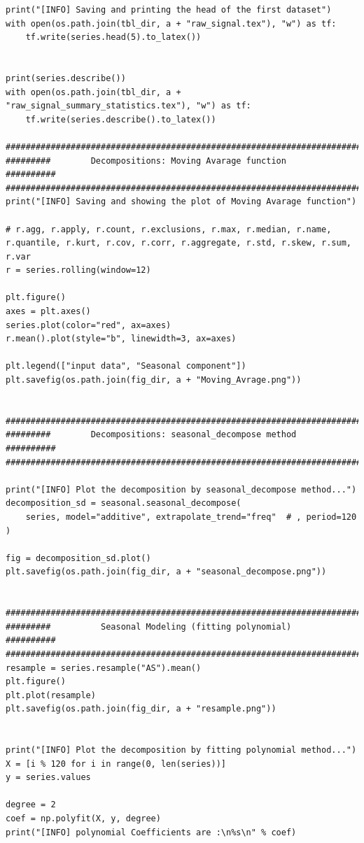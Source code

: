 \documentclass[12pt]{article}
\begin{document}
\begin{lstlisting}
print("[INFO] Saving and printing the head of the first dataset")
with open(os.path.join(tbl_dir, a + "raw_signal.tex"), "w") as tf:
    tf.write(series.head(5).to_latex())


print(series.describe())
with open(os.path.join(tbl_dir, a + "raw_signal_summary_statistics.tex"), "w") as tf:
    tf.write(series.describe().to_latex())

############################################################################
#########        Decompositions: Moving Avarage function          ##########
############################################################################
print("[INFO] Saving and showing the plot of Moving Avarage function")

# r.agg, r.apply, r.count, r.exclusions, r.max, r.median, r.name, r.quantile, r.kurt, r.cov, r.corr, r.aggregate, r.std, r.skew, r.sum, r.var
r = series.rolling(window=12)

plt.figure()
axes = plt.axes()
series.plot(color="red", ax=axes)
r.mean().plot(style="b", linewidth=3, ax=axes)

plt.legend(["input data", "Seasonal component"])
plt.savefig(os.path.join(fig_dir, a + "Moving_Avrage.png"))


############################################################################
#########        Decompositions: seasonal_decompose method        ##########
############################################################################

print("[INFO] Plot the decomposition by seasonal_decompose method...")
decomposition_sd = seasonal.seasonal_decompose(
    series, model="additive", extrapolate_trend="freq"  # , period=120
)

fig = decomposition_sd.plot()
plt.savefig(os.path.join(fig_dir, a + "seasonal_decompose.png"))


############################################################################
#########          Seasonal Modeling (fitting polynomial)         ##########
############################################################################
resample = series.resample("AS").mean()
plt.figure()
plt.plot(resample)
plt.savefig(os.path.join(fig_dir, a + "resample.png"))


print("[INFO] Plot the decomposition by fitting polynomial method...")
X = [i % 120 for i in range(0, len(series))]
y = series.values

degree = 2
coef = np.polyfit(X, y, degree)
print("[INFO] polynomial Coefficients are :\n%s\n" % coef)



\end{lstlisting}
\end{document}

